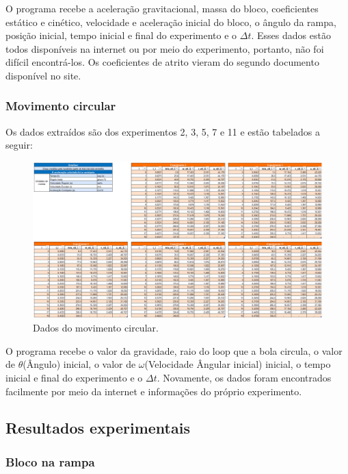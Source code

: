 \documentclass{article}
\begin{document}
\qquad O programa recebe a aceleração gravitacional, massa do bloco, coeficientes estático e cinético, velocidade e aceleração inicial do bloco, o ângulo da rampa, posição inicial, tempo inicial e final do experimento e o $\Delta t$. Esses dados estão todos disponíveis na internet ou por meio do experimento, portanto, não foi difícil encontrá-los. Os coeficientes de atrito vieram do segundo documento disponível no site.



\subsubsection{Movimento circular}
\qquad Os dados extraídos são dos experimentos 2, 3, 5, 7 e 11 e estão tabelados a seguir:


\begin{figure}[!h]
    \centering
    \includegraphics[width=16cm]{./img/tabelas_movimento_circular.png}
    \caption{Dados do movimento circular.}
\end{figure}

\qquad O programa recebe o valor da gravidade, raio do loop que a bola circula, o valor de $\theta$(Ângulo) inicial, o valor de $\omega$(Velocidade Ângular inicial) inicial, o tempo inicial e final do experimento e o $\Delta t$. Novamente, os dados foram encontrados facilmente por meio da internet e informações do próprio experimento.

\subsection{Resultados experimentais}

\subsubsection{Bloco na rampa}
\end{document}
